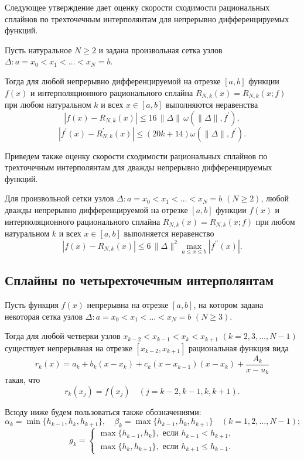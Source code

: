 Следующее утверждение дает оценку скорости сходимости рациональных сплайнов по
трехточечным интерполянтам для непрерывно дифференцируемых функций.

\begin{theorem}\label{teor2.2} Пусть натуральное $N\geqslant 2$  и задана произвольная
сетка узлов $\Delta: a=x_0<x_1<\dots<x_N=b$.

Тогда для любой непрерывно дифференцируемой на отрезке $[a,b]$ функции $f(x)$
и интерполяционного рационального сплайна $R_{N,k}(x)=R_{N,k} (x; f)$ при
любом натуральном $k$ и всех $x\in [a,b]$ выполняются неравенства
$$
|f(x)-R_{N, k}(x)|\leqslant 16\, \|\Delta\| \,\omega (\|\Delta\|, f^\prime),
$$
$$
|f^\prime (x)-R^\prime_{N,k}(x)|\leqslant (20k+14) \omega (\|\Delta\|, f^\prime).
$$
\end{theorem}


Приведем также оценку скорости сходимости рациональных сплайнов по трехточечным интерполянтам для
 дважды непрерывно дифференцируемых функций.

\begin{theorem}\label{teor2.3}  Для произвольной сетки узлов $ \Delta: a=x_0<x_1<\dots<x_N=b$
 $(N \geqslant 2)$, любой дважды непрерывно дифференцируемой на отрезке $[a, b]$ функции $f(x)$
и интерполяционного рационального сплайна
$R_{N, k}(x)=R_{N, k} (x; f)$ при любом натуральном $k$ и всех
$x\in [a,b]$ выполняется неравенство
$$
|f(x)-R_{N,k}(x)|\leqslant 6\, \|\Delta\|^2
\max_{a\leqslant x \leqslant b}|f^{\prime\prime}(x)|.
$$
\end{theorem}

\subsection{Сплайны по четырехточечным интерполянтам}

Пусть функция $f(x)$ непрерывна на отрезке $[a,b]$, на котором задана
некоторая сетка узлов $\Delta: a=x_0<x_1<\dots<x_N=b$ $(N\geqslant 3)$.

Тогда для любой четверки узлов $x_{k-2}<x_{k-1}<x_k<x_{k+1}$ $(k=2,3,\dots, N-1)$
существует непрерывная на отрезке $[x_{k-2}, x_{k+1}]$ рациональная функция вида
\begin{equation}\label{3.1}
r_k(x)=a_k+b_k(x-x_k)+c_k(x-x_{k-1})(x-x_k)+\frac{A_k}{x-u_k}
\end{equation}
такая, что
$$
r_k(x_j)=f(x_j)\quad (j=k-2,k-1,k,k+1).
$$

Всюду ниже будем пользоваться также обозначениями:
$$
 \alpha_k=\min\{h_{k-1},h_k, h_{k+1}\},\quad
\beta_k=\max \{h_{k-1},h_k, h_{k+1}\}\quad (k=1,2,\dots,N-1);
$$
$$
g_k=\begin{cases} \max\{h_{k-1}, h_k\}, \text{ если } h_{k-1}<h_{k+1},\\
\max\{h_k, h_{k+1}\}, \text{ если } h_{k+1}\leqslant h_{k-1}.
\end{cases}
$$

